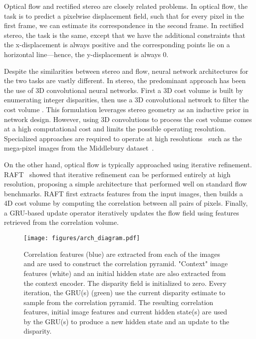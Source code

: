 \documentclass[10pt,twocolumn,letterpaper]{article}
\begin{document}
Optical flow and rectified stereo are closely related problems. In optical flow, the task is to predict a pixelwise displacement field, such that for every pixel in the first frame, we can estimate its correspondence in the second frame. In rectified stereo, the task is the same, except that we have the additional constraints that the x-displacement is always positive and the corresponding points lie on a horizontal line---hence, the y-displacement is always 0. 

Despite the similarities between stereo and flow, neural network architectures for the two tasks are vastly different. In stereo, the predominant approach has been the use of 3D convolutional neural networks. First a 3D cost volume is built by enumerating integer disparities, then use a 3D convolutional network to filter the cost volume \cite{mvnsnet,psmnet,gcnet,gwcnet,ganet,dsmnet}. This formulation leverages stereo geometry as an inductive prior in network design. However, using 3D convolutions to process the cost volume comes at a high computational cost and limits the possible operating resolution. Specialized approaches are required to operate at high resolutions~\cite{yang2019hierarchical} such as the mega-pixel images from the Middlebury dataset~\cite{middlebury}.

On the other hand, optical flow is typically approached using iterative refinement. RAFT~\cite{teed2020raft} showed that iterative refinement can be performed entirely at high resolution, proposing a simple architecture that performed well on standard flow benchmarks. RAFT first extracts features from the input images, then builds a 4D cost volume by computing the correlation between all pairs of pixels. Finally, a GRU-based update operator iteratively updates the flow field using features retrieved from the correlation volume. 

\begin{figure*}[h]
    \centering
	\texttt{[image: figures/arch\_diagram.pdf]}
	\caption{Correlation features (blue) are extracted from each of the images and are used to construct the correlation pyramid. "Context" image features (white) and an initial hidden state are also extracted from the context encoder. The disparity field is initialized to zero. Every iteration, the GRU(s) (green) use the current disparity estimate to sample from the correlation pyramid. The resulting correlation features, initial image features and current hidden state(s) are used by the GRU(s) to produce a new hidden state and an update to the disparity. }
	\label{fig:archdiagram}
\end{figure*}
\end{document}
